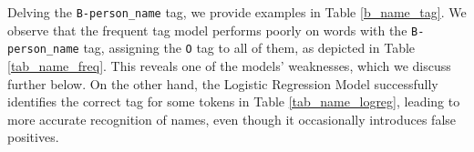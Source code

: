\documentclass[11pt,a4paper]{article}
\begin{document}
\begin{table}
    \begin{minipage}{.45\linewidth}
      \centering
    \label{tab_name_freq}
    \end{minipage}%
    \hspace{0.05\linewidth}
    \begin{minipage}{.45\linewidth}
      \centering
    \label{tab_name_logreg}
    \end{minipage} 
    \caption{Labels and predicted tags for each word for both models}
    \label{b_name_tag}
\end{table}

Delving the \texttt{B-person\_name} tag, we provide examples in Table \ref{b_name_tag}. We observe that the frequent tag model performs poorly on words with the \texttt{B-person\_name} tag, assigning the \texttt{O} tag to all of them, as depicted in Table \ref{tab_name_freq}. This reveals one of the models' weaknesses, which we discuss further below. On the other hand, the Logistic Regression Model successfully identifies the correct tag for some tokens in Table \ref{tab_name_logreg}, leading to more accurate recognition of names, even though it occasionally introduces false positives.
\end{document}
